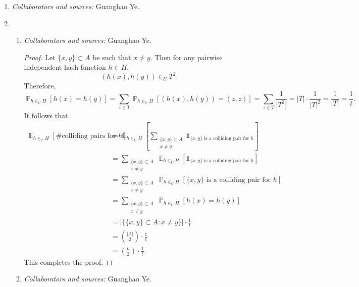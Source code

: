 \documentclass[letterpaper, reqno,11pt]{article}
\newcommand{\PP}{\mathop{{}\mathbb{P}}}
\newcommand{\EE}{\mathop{{}\mathbb{E}}}
\begin{document}
\begin{enumerate}
  \item \noindent\emph{Collaborators and sources:} Guanghao Ye.
  
  \clearpage

  \item \begin{enumerate}
    \item \noindent\emph{Collaborators and sources:} Guanghao Ye.
    
    \begin{proof}
      Let $\{ x, y \} \subset A$ be such that $x \neq y$. Then for any pairwise independent hash function $h \in H$,
      $$ (h(x), h(y)) \in_U T^2. $$
      Therefore,
      $$ \PP_{h \in_U H}[h(x) = h(y)] = \sum_{z \in T} \PP_{h \in_U H}[(h(x), h(y)) = (z, z)] = \sum_{z \in T} \frac{1}{\left|T^2\right|} = |T| \cdot \frac{1}{|T|^2} = \frac{1}{|T|} = \frac{1}{t}. $$
      It follows that
      \begin{align*}
        \EE_{h \in_U H}[\text{\# colliding pairs for $h$}] &= \EE_{h \in_U H}\left[\sum_{\substack{\{ x, y \} \subset A \\ x \neq y}} \mathds 1_{\text{$\{ x, y \}$ is a colliding pair for $h$}}\right] \\
        &= \sum_{\substack{\{ x, y \} \subset A \\ x \neq y}} \EE_{h \in_U H}\left[\mathds 1_{\text{$\{ x, y \}$ is a colliding pair for $h$}}\right] \\
        &= \sum_{\substack{\{ x, y \} \subset A \\ x \neq y}} \PP_{h \in_U H}\left[\text{$\{ x, y \}$ is a colliding pair for $h$}\right] \\
        &= \sum_{\substack{\{ x, y \} \subset A \\ x \neq y}} \PP_{h \in_U H}[h(x) = h(y)] \\
        &= |\{ \{ x, y \} \subset A : x \neq y \}| \cdot \frac{1}{t} \\
        &= \binom{|A|}{2} \cdot \frac{1}{t} \\
        &= \binom{n}{2} \cdot \frac{1}{t}.
      \end{align*}
      This completes the proof.
    \end{proof}
    
    \clearpage

    \item \noindent\emph{Collaborators and sources:} Guanghao Ye.
    

\end{enumerate}
\end{enumerate}
\end{document}
